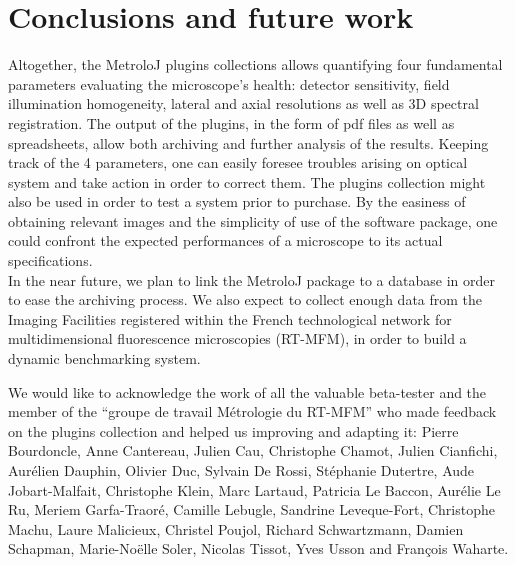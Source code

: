 \documentclass[]{spie}
\begin{document}
\section{Conclusions and future work}
\label{sec:concFut}

Altogether, the MetroloJ plugins collections allows quantifying four fundamental parameters evaluating the microscope's health: detector sensitivity, field illumination homogeneity, lateral and axial resolutions as well as 3D spectral registration. The output of the plugins, in the form of pdf files as well as spreadsheets, allow both archiving and further analysis of the results. Keeping track of the 4 parameters, one can easily foresee troubles arising on optical system and take action in order to correct them. The plugins collection might also be used in order to test a system prior to purchase. By the easiness of obtaining relevant images and the simplicity of use of the software package, one could confront the expected performances of a microscope to its actual specifications.\\
In the near future, we plan to link the MetroloJ package to a database in order to ease the archiving process. We also expect to collect enough data from the Imaging Facilities registered within the French technological network for multidimensional fluorescence microscopies (RT-MFM), in order to build a dynamic benchmarking system.


\acknowledgments
 
We would like to acknowledge the work of all the valuable beta-tester and the member of the ``groupe de travail Métrologie du RT-MFM'' who made feedback on the plugins collection and helped us improving and adapting it: Pierre Bourdoncle, Anne Cantereau, Julien Cau, Christophe Chamot, Julien Cianfichi, 
Aurélien Dauphin, Olivier Duc, Sylvain De Rossi, Stéphanie Dutertre, Aude Jobart-Malfait, Christophe Klein, Marc Lartaud, Patricia Le Baccon, Aurélie Le Ru, Meriem Garfa-Traoré, Camille Lebugle, Sandrine Leveque-Fort, Christophe Machu, Laure Malicieux, Christel Poujol, Richard Schwartzmann, Damien Schapman, Marie-Noëlle Soler, Nicolas Tissot, Yves Usson and Fran\c cois Waharte.


\end{document}

